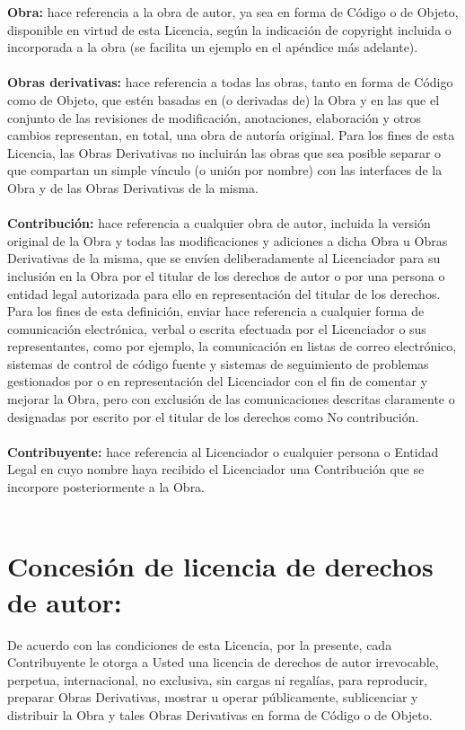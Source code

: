 \textbf{Obra:} hace referencia a la obra de autor, ya sea en forma de Código o de Objeto, disponible en virtud de esta Licencia, según la indicación de copyright incluida o incorporada a la obra (se facilita un ejemplo en el apéndice más adelante).\\\\

\textbf{Obras derivativas:} hace referencia a todas las obras, tanto en forma de Código como de Objeto, que estén basadas en (o derivadas de) la Obra y en las que el conjunto de las revisiones de modificación, anotaciones, elaboración y otros cambios representan, en total, una obra de autoría original. Para los fines de esta Licencia, las Obras Derivativas no incluirán las obras que sea posible separar o que compartan un simple vínculo (o unión por nombre) con las interfaces de la Obra y de las Obras Derivativas de la misma.\\\\

\textbf{Contribución:} hace referencia a cualquier obra de autor, incluida la versión original de la Obra y todas las modificaciones y adiciones a dicha Obra u Obras Derivativas de la misma, que se envíen deliberadamente al Licenciador para su inclusión en la Obra por el titular de los derechos de autor o por una persona o entidad legal autorizada para ello en representación del titular de los derechos. Para los fines de esta definición, enviar hace referencia a cualquier forma de comunicación electrónica, verbal o escrita efectuada por el Licenciador o sus representantes, como por ejemplo, la comunicación en listas de correo electrónico, sistemas de control de código fuente y sistemas de seguimiento de problemas gestionados por o en representación del Licenciador con el fin de comentar y mejorar la Obra, pero con exclusión de las comunicaciones descritas claramente o designadas por escrito por el titular de los derechos como No contribución.\\\\

\textbf{Contribuyente:} hace referencia al Licenciador o cualquier persona o Entidad Legal en cuyo nombre haya recibido el Licenciador una Contribución que se incorpore posteriormente a la Obra.\\\\

\section{Concesión de licencia de derechos de autor:}De acuerdo con las condiciones de esta Licencia, por la presente, cada Contribuyente le otorga a Usted una licencia de derechos de autor irrevocable, perpetua, internacional, no exclusiva, sin cargas ni regalías, para reproducir, preparar Obras Derivativas, mostrar u operar públicamente, sublicenciar y distribuir la Obra y tales Obras Derivativas en forma de Código o de Objeto.\\\\
\newpage
